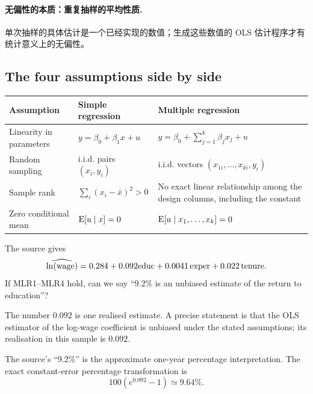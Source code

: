 \paragraph{无偏性的本质：重复抽样的平均性质.}
单次抽样的具体估计是一个已经实现的数值；生成这些数值的 OLS 估计程序才有统计意义上的无偏性。

\subsection{The four assumptions side by side}
\begin{center}
\small\renewcommand{\arraystretch}{1.35}
\begin{tabular}{P{3.1cm}P{5.35cm}P{6.3cm}}
\toprule
Assumption & Simple regression & Multiple regression\\
\midrule
Linearity in parameters & $y=\beta_0+\beta_1x+u$ & $y=\beta_0+\sum_{j=1}^k\beta_jx_j+u$\\
Random sampling & i.i.d. pairs $(x_i,y_i)$ & i.i.d. vectors $(x_{1i},\ldots,x_{ki},y_i)$\\
Sample rank & $\sum_i(x_i-\bar x)^2>0$ & No exact linear relationship among the design columns, including the constant\\
Zero conditional mean & $\operatorname{E}[u\mid x]=0$ & $\operatorname{E}[u\mid x_1,\ldots,x_k]=0$\\
\bottomrule
\end{tabular}
\end{center}

\begin{example}\label{ex:unbiased-number}
The source gives
\[\widehat{\ln(\mathrm{wage})}
=0.284+0.092\mathrm{educ}+0.0041\,\mathrm{exper}+0.022\,\mathrm{tenure}.\]
If MLR1--MLR4 hold, can we say ``9.2\% is an unbiased estimate of the return to education''?

 The number $0.092$ is one realised estimate. A precise statement is that the OLS estimator of the log-wage coefficient is unbiased under the stated assumptions; its realisation in this sample is $0.092$.

The source's ``9.2\%'' is the approximate one-year percentage interpretation. The exact constant-error percentage transformation is
\[100(e^{0.092}-1)\simeq9.64\%.
\]
\end{example}

